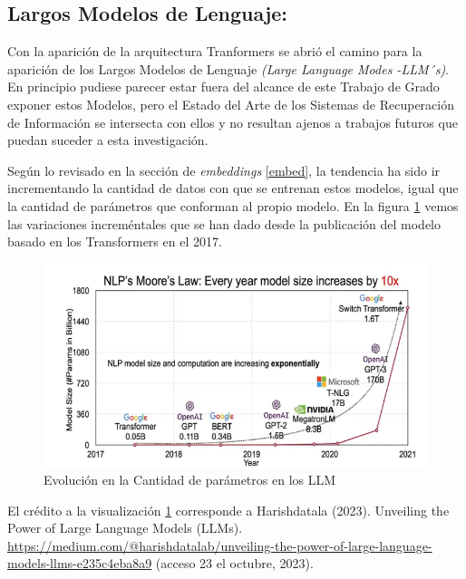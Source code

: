 \documentclass[
  10,
  openany]{book}
\begin{document}
\hypertarget{LLM}{%
\subsection{Largos Modelos de Lenguaje:}\label{LLM}}

Con la aparición de la arquitectura Tranformers se abrió el camino para la aparición de los Largos Modelos de Lenguaje \emph{(Large Language Modes -LLM´s)}. En principio pudiese parecer estar fuera del alcance de este Trabajo de Grado exponer estos Modelos, pero el Estado del Arte de los Sistemas de Recuperación de Información se intersecta con ellos y no resultan ajenos a trabajos futuros que puedan suceder a esta investigación.

Según lo revisado en la sección de \emph{embeddings} \ref{embed}, la tendencia ha sido ir incrementando la cantidad de datos con que se entrenan estos modelos, igual que la cantidad de parámetros que conforman al propio modelo. En la figura \ref{fig:llm} vemos las variaciones increméntales que se han dado desde la publicación del modelo basado en los Transformers en el 2017.

\begin{figure}

{\centering \includegraphics[width=0.85\linewidth]{images/03-marco-teorico/llms} 

}

\caption{Evolución en la Cantidad de parámetros en los LLM}\label{fig:llm}
\end{figure}

El crédito a la visualización \ref{fig:llm} corresponde a Harishdatala (2023). Unveiling the Power of Large Language Models (LLMs). \url{https://medium.com/@harishdatalab/unveiling-the-power-of-large-language-models-llms-e235c4eba8a9} (acceso 23 el octubre, 2023).
\end{document}

